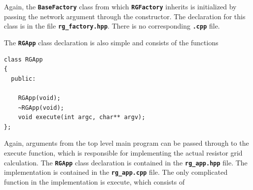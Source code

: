 \documentclass[12pt]{report} %
\begin{document}
Again, the \texttt{\textbf{BaseFactory}} class from which \texttt{\textbf{RGFactory}} inherits is initialized by passing the network argument through the constructor. The declaration for this class is in the file \texttt{\textbf{rg\_factory.hpp}}. There is no corresponding \texttt{\textbf{.cpp}} file.

The \texttt{\textbf{RGApp}} class declaration is also simple and consists of the functions

{
\color{red}
\begin{Verbatim}[fontseries=b]
class RGApp
{
  public:

    RGApp(void);
    ~RGApp(void);
    void execute(int argc, char** argv);
};
\end{Verbatim}
}

Again, arguments from the top level main program can be passed through to the execute function, which is responsible for implementing the actual resistor grid calculation. The \texttt{\textbf{RGApp}} class declaration is contained in the \texttt{\textbf{rg\_app.hpp}} file. The implementation is contained in the \texttt{\textbf{rg\_app.cpp}} file. The only complicated function in the implementation is execute, which consists of
\end{document}
